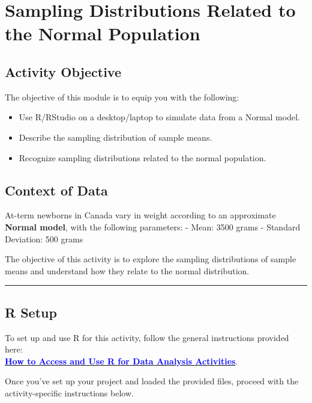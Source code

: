 \documentclass[oneside,openany]{book}
\begin{document}
\chapter{Sampling Distributions Related to the Normal Population}\label{activity-3---sampling-distributions-related-to-the-normal-population}

\section{Activity Objective}\label{activity-objective}

The objective of this module is to equip you with the following:
\begin{itemize}
    \item Use R/RStudio on a desktop/laptop to simulate data from a Normal model.
    \item Describe the sampling distribution of sample means.
    \item Recognize sampling distributions related to the normal population.
\end{itemize}


\section{Context of Data}\label{context-of-data-2}

At-term newborns in Canada vary in weight according to an approximate \textbf{Normal model}, with the following parameters:
- Mean: 3500 grams
- Standard Deviation: 500 grams

The objective of this activity is to explore the sampling distributions of sample means and understand how they relate to the normal distribution.

\begin{center}\rule{0.5\linewidth}{0.5pt}\end{center}

\section{R Setup}\label{r-setup-2}

To set up and use R for this activity, follow the general instructions provided here:\\
\hyperref[how-to-set-up-r-for-data-analysis-activities]{\textcolor{blue}{\textbf{How to Access and Use R for Data Analysis Activities}}}.

Once you've set up your project and loaded the provided files, proceed with the activity-specific instructions below.
\end{document}
